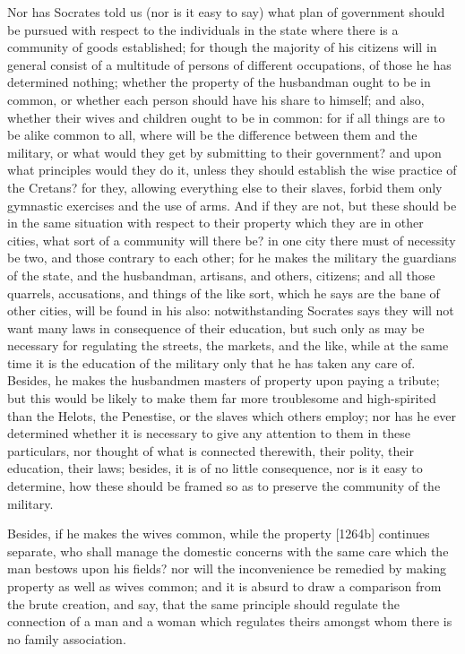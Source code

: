 Nor has Socrates told us (nor is it easy to say) what plan of government
should be pursued with respect to the individuals in the state where there
is a community of goods established; for though the majority of his
citizens will in general consist of a multitude of persons of different
occupations, of those he has determined nothing; whether the property of
the husbandman ought to be in common, or whether each person should have
his share to himself; and also, whether their wives and children ought to
be in common: for if all things are to be alike common to all, where will
be the difference between them and the military, or what would they get by
submitting to their government? and upon what principles would they do it,
unless they should establish the wise practice of the Cretans? for they,
allowing everything else to their slaves, forbid them only gymnastic
exercises and the use of arms. And if they are not, but these should be in
the same situation with respect to their property which they are in other
cities, what sort of a community will there be? in one city there must of
necessity be two, and those contrary to each other; for he makes the
military the guardians of the state, and the husbandman, artisans, and
others, citizens; and all those quarrels, accusations, and things of the
like sort, which he says are the bane of other cities, will be found in
his also: notwithstanding Socrates says they will not want many laws in
consequence of their education, but such only as may be necessary for
regulating the streets, the markets, and the like, while at the same time
it is the education of the military only that he has taken any care of.
Besides, he makes the husbandmen masters of property upon paying a
tribute; but this would be likely to make them far more troublesome and
high-spirited than the Helots, the Penestise, or the slaves which others
employ; nor has he ever determined whether it is necessary to give any
attention to them in these particulars, nor thought of what is connected
therewith, their polity, their education, their laws; besides, it is of no
little consequence, nor is it easy to determine, how these should be
framed so as to preserve the community of the military.

Besides, if he makes the wives common, while the property [1264b]
continues separate, who shall manage the domestic concerns with the same
care which the man bestows upon his fields? nor will the inconvenience be
remedied by making property as well as wives common; and it is absurd to
draw a comparison from the brute creation, and say, that the same
principle should regulate the connection of a man and a woman which
regulates theirs amongst whom there is no family association.

